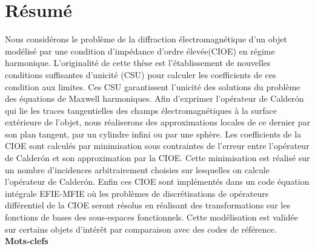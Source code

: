 \thispagestyle{empty}
\begin{center}
\Large
\textbf{\doctitlefr}
\end{center}
\section*{Résumé}
Nous considérons le problème de la diffraction électromagnétique d'un objet modélisé par une condition d'impédance d'ordre élevée(CIOE) en régime harmonique.
L'originalité de cette thèse est l'établissement de nouvelles conditions suffisantes d'unicité (CSU) pour calculer les coefficients de ces condition aux limites. Ces CSU garantissent l'unicité des solutions du problème des équations de Maxwell harmoniques.
Afin d'exprimer l'opérateur de Calderón qui lie les traces tangentielles des champs électromagnétiques à la surface extérieure de l'objet, nous réaliserons des approximations locales de ce dernier par son plan tangent, par un cylindre infini ou par une sphère.
Les coefficients de la CIOE sont calculés par minimisation sous contraintes de l'erreur entre l'opérateur de Calderón et son approximation par la CIOE.
Cette minimisation est réalisé sur un nombre d'incidences arbitrairement choisies sur lesquelles on calcule l'opérateur de Calderón.
Enfin ces CIOE sont implémentés dans un code équation intégrale EFIE-MFIE où les problèmes de discrétisations de opérateurs différentiel de la CIOE seront résolus en réalisant des transformations sur les fonctions de bases des sous-espaces fonctionnels.
Cette modélisation est validée sur certains objets d'intérêt par comparaison avec des codes de référence.
\\

\textbf{Mots-clefs}


\dockeywordsfr

\hrulefill
\begin{center}
\Large
\textbf{\doctitleeng}
\end{center}
